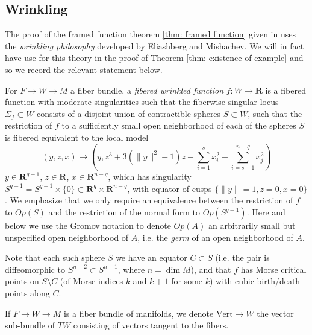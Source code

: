 \documentclass{amsart}
\def\bR{\mathbf{R}}
\theoremstyle{definition}
\theoremstyle{remark}
\newtheorem{inductive lemma}[theorem]{Inductive Lemma}
\begin{document}
\subsection{Wrinkling}

The proof of the framed function theorem \ref{thm: framed function} given in \cite{EM12} uses the {\em wrinkling philosophy} developed by Eliashberg and Mishachev. We will in fact have use for this theory in the proof of Theorem \ref{thm: existence of example} and so we record the relevant statement below.

For $F \to W \to M$ a fiber bundle, a {\em fibered wrinkled function} $f:W \to \bR$ is a fibered function with moderate singularities such that the fiberwise singular locus $\Sigma_f \subset W$ consists of a disjoint union of contractible spheres $S \subset W$, such that the restriction of $f$ to a sufficiently small open neighborhood of each of the spheres $S$ is fibered equivalent to the local model
$$ (y,z,x) \mapsto \left( y, z^3+3(\|y\|^2-1)z - \sum_{i=1}^s x_i^2 + \sum_{i=s+1}^{n-q}x_j^2 \right)$$
$y \in \bR^{q-1}$, $z \in \bR$, $x \in \bR^{n-q}$, which has singularity $S^{q-1} =S^{q-1} \times \{0 \} \subset \bR^q \times \bR^{n-q}$, with equator of cusps $\{\|y\|=1, z=0,x=0\}$. We emphasize that we only require an equivalence between the restriction of $f$ to $Op(S)$ and the restriction of the normal form to $Op(S^{q-1})$. Here and below we use the Gromov notation to denote $Op(A)$ an arbitrarily small but unspecified open neighborhood of $A$, i.e. the {\em germ} of an open neighborhood of $A$.

Note that each such sphere $S$ we have an equator $C \subset S$ (i.e. the pair is diffeomorphic to $S^{n-2} \subset S^{n-1}$, where $n=\dim M$), and that $f$ has Morse critical points on $S \setminus C$ (of Morse indices $k$ and $k+1$ for some $k$) with  cubic birth/death points along $C$. 

If $F \to W \to M$ is a fiber bundle of manifolds, we denote $\text{Vert} \to W$ the vector sub-bundle of $TW$ consisting of vectors tangent to the fibers. 
\end{document}
